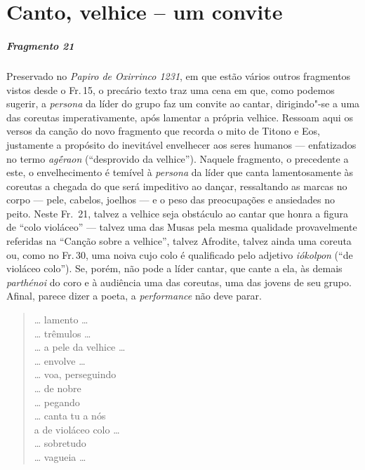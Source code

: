 \chapter{Canto, velhice -- um convite}


\paragraph{Fragmento 21}

{\small Preservado no \emph{Papiro de Oxirrinco 1231}, em que estão vários
outros fragmentos vistos desde o Fr.\,15, o precário texto traz uma
cena em que, como podemos sugerir, a \emph{persona} da líder do grupo
faz um convite ao cantar, dirigindo"-se a uma das coreutas
imperativamente, após lamentar a própria velhice. Ressoam aqui os versos
da canção do novo fragmento que recorda o mito de Titono e Eos,
justamente a propósito do inevitável envelhecer aos seres humanos ---
enfatizados no termo \emph{agḗraon} (``desprovido da velhice'').
Naquele fragmento, o precedente a este, o envelhecimento é temível à \emph{persona} da líder que canta lamentosamente às
coreutas a chegada do que será impeditivo ao dançar, ressaltando as
marcas no corpo --- pele, cabelos, joelhos --- e o peso das
preocupações e ansiedades no peito. Neste Fr.~21, talvez a
velhice seja obstáculo ao cantar que honra a figura de ``colo violáceo''
--- talvez uma das Musas pela mesma qualidade provavelmente referidas na
``Canção sobre a velhice'', talvez Afrodite, talvez ainda uma coreuta
ou, como no Fr.\,30, uma noiva cujo colo é qualificado pelo adjetivo \textit{iókolpon} (``de violáceo colo''). Se, porém, não pode a líder cantar, que
cante a ela, às demais \emph{parthénoi} do coro e à audiência uma das
coreutas, uma das jovens de seu grupo. Afinal, parece dizer a poeta, a
\emph{performance} não deve parar.}

\begin{verse}
\ldots{} lamento \ldots{}\\
\ldots{} trêmulos \ldots{}\\
\ldots{} a pele da velhice \ldots{}\\
\ldots{} envolve \ldots{}\\
\ldots{} voa, perseguindo\\
\ldots{} de nobre\\
\ldots{} pegando\\
\ldots{} canta tu a nós\\
a de violáceo colo \ldots{}\\
\ldots{} sobretudo\\
\ldots{} vagueia \ldots{}
\end{verse}


